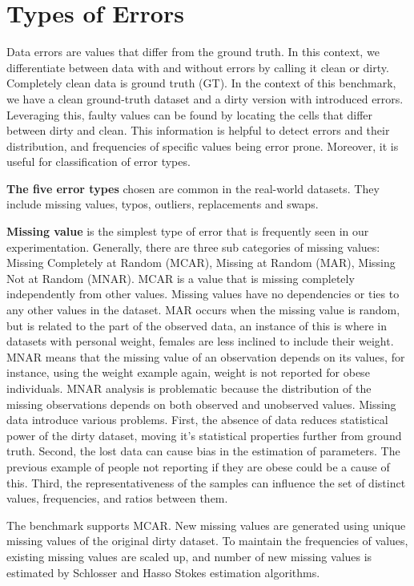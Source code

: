 \section{Types of Errors}
\label{sec:error_types}

Data errors are values that differ from the ground truth.
In this context, we differentiate between data with and without errors by calling it clean or dirty. 
Completely clean data is ground truth (GT).  
In the context of this benchmark, we have a clean ground-truth dataset and a dirty version with introduced errors.  
Leveraging this, faulty values can be found by locating the cells that differ between dirty and clean. 
This information is helpful to detect errors and their distribution, and frequencies of specific values being error prone.  
Moreover, it is useful for classification of error types.


\textbf{The five error types} chosen are common in the real-world datasets. They include missing values, typos, outliers, replacements and swaps. 


\textbf{Missing value} is the simplest type of error that is frequently seen in our experimentation. 
Generally, there are three sub categories of missing values: 
Missing Completely at Random (MCAR), Missing at Random (MAR), Missing Not at Random (MNAR). 
MCAR is a value that is missing completely independently from other values. 
Missing values have no dependencies or ties to any other values in the dataset. 
MAR occurs when the missing value is random, but is related to the part of the observed data, an instance of this is where in datasets with personal weight, females are less inclined to include their weight. 
MNAR means that the missing value of an observation depends on its values, for instance, using the weight example again, weight is not reported for obese individuals.
MNAR analysis is problematic because the distribution of the missing observations depends on both observed and unobserved values.
Missing data introduce various problems. 
First, the absence of data reduces statistical power of the dirty dataset, moving it's statistical properties further from ground truth.
Second, the lost data can cause bias in the estimation of parameters. The previous example of people not reporting if they are obese could be a cause of this. 
Third, the representativeness of the samples can influence the set of distinct values, frequencies, and ratios between them.

The benchmark supports MCAR. 
New missing values are generated using unique missing values of the original dirty dataset. 
To maintain the frequencies of values, existing missing values are scaled up, and number of new missing values is estimated by Schlosser \cite{HassNSS1995} and Hasso Stokes \cite{HassS1998} estimation algorithms.

